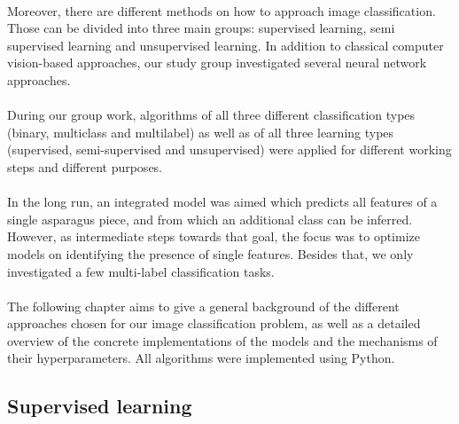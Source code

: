 \\
Moreover, there are different methods on how to approach image classification. Those can be divided into three main groups: supervised learning, semi supervised learning and unsupervised learning. In addition to classical computer vision-based approaches, our study group investigated several neural network approaches. \\
\\
During our group work, algorithms of all three different classification types (binary, multiclass and multilabel) as well as of all three learning types (supervised, semi-supervised and unsupervised) were applied for different working steps and different purposes. \\
\\
In the long run, an integrated model was aimed which predicts all features of a single asparagus piece, and from which an additional class can be inferred. However, as intermediate steps towards that goal, the focus was to optimize models on identifying the presence of single features. Besides that, we only investigated a few multi-label classification tasks.   \\
\\
The following chapter aims to give a general background of the different approaches chosen for our image classification problem, as well as a detailed overview of the concrete implementations of the models and the mechanisms of their hyperparameters. 
All algorithms were implemented using Python.  


\subsection{Supervised learning}

